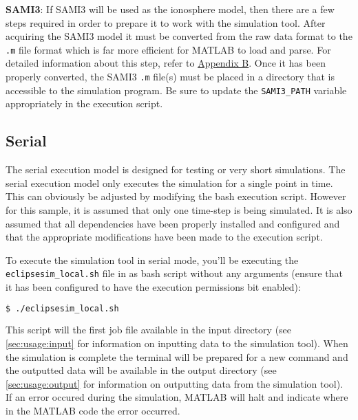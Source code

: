 \documentclass[12pt,letterpaper]{article}
\begin{document}

{\bf SAMI3}: If SAMI3 will be used as the ionosphere model, then there are a few
steps required in order to prepare it to work with the simulation tool. After
acquiring the SAMI3 model it must be converted from the raw data format to the
{\tt *.m} file format which is far more efficient for MATLAB to load and
parse. For detailed information about this step, refer to
\hyperref[sec:sami3_df]{Appendix B}. Once it has been properly converted, the
SAMI3 {\tt *.m} file(s) must be placed in a directory that is accessible to the
simulation program. Be sure to update the {\tt SAMI3\_PATH} variable
appropriately in the execution script.

\subsection{Serial}
\label{sec:usage:serial}

The serial execution model is designed for testing or very short
simulations. The serial execution model only executes the simulation for a
single point in time. This can obviously be adjusted by modifying the bash
execution script. However for this sample, it is assumed that only one time-step
is being simulated. It is also assumed that all dependencies have been properly
installed and configured and that the appropriate modifications have been made
to the execution script.

To execute the simulation tool in serial mode, you'll be executing the {\tt
  eclipsesim\_local.sh} file in as bash script without any arguments (ensure
that it has been configured to have the execution permissions bit enabled):

\begin{lstlisting}[language=bash]
  $ ./eclipsesim_local.sh
\end{lstlisting}

This script will the first job file available in the input directory (see
\autoref{sec:usage:input} for information on inputting data to the simulation
tool). When the simulation is complete the terminal will be prepared for a new
command and the outputted data will be available in the output directory (see
\autoref{sec:usage:output} for information on outputting data from the
simulation tool). If an error occured during the simulation, MATLAB will halt
and indicate where in the MATLAB code the error occurred.
\end{document}
